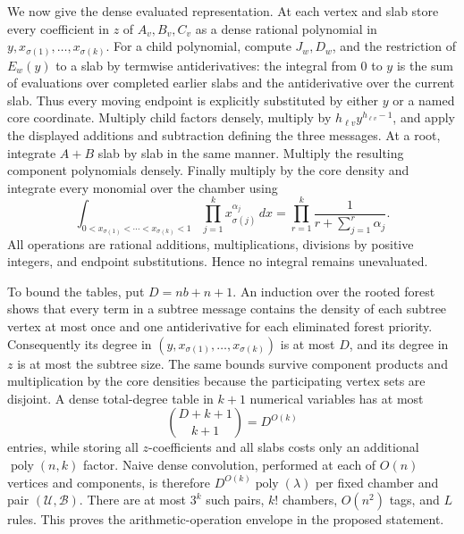 We now give the dense evaluated representation.  At each vertex and slab store every coefficient in \(z\) of \(A_v,B_v,C_v\) as a dense rational polynomial in \(y,x_{\sigma(1)},\ldots,x_{\sigma(k)}\).  For a child polynomial, compute \(J_w,D_w\), and the restriction of \(E_w(y)\) to a slab by termwise antiderivatives: the integral from \(0\) to \(y\) is the sum of evaluations over completed earlier slabs and the antiderivative over the current slab.  Thus every moving endpoint is explicitly substituted by either \(y\) or a named core coordinate.  Multiply child factors densely, multiply by \(h_{\ell v}y^{h_{\ell v}-1}\), and apply the displayed additions and subtraction defining the three messages.  At a root, integrate \(A+B\) slab by slab in the same manner.  Multiply the resulting component polynomials densely.  Finally multiply by the core density and integrate every monomial over the chamber using
\[
 \int_{0<x_{\sigma(1)}<\cdots<x_{\sigma(k)}<1}
    \prod_{j=1}^kx_{\sigma(j)}^{\alpha_j}\,dx
 =\prod_{r=1}^k\frac{1}{r+\sum_{j=1}^r\alpha_j}.
\]
All operations are rational additions, multiplications, divisions by positive integers, and endpoint substitutions.  Hence no integral remains unevaluated.

To bound the tables, put \(D=nb+n+1\).  An induction over the rooted forest shows that every term in a subtree message contains the density of each subtree vertex at most once and one antiderivative for each eliminated forest priority.  Consequently its degree in \((y,x_{\sigma(1)},\ldots,x_{\sigma(k)})\) is at most \(D\), and its degree in \(z\) is at most the subtree size.  The same bounds survive component products and multiplication by the core densities because the participating vertex sets are disjoint.  A dense total-degree table in \(k+1\) numerical variables has at most
\[
 \binom{D+k+1}{k+1}=D^{O(k)}
\]
entries, while storing all \(z\)-coefficients and all slabs costs only an additional \(\operatorname{poly}(n,k)\) factor.  Naive dense convolution, performed at each of \(O(n)\) vertices and components, is therefore \(D^{O(k)}\operatorname{poly}(\lambda)\) per fixed chamber and pair \((\mathcal U,\mathcal B)\).  There are at most \(3^k\) such pairs, \(k!\) chambers, \(O(n^2)\) tags, and \(L\) rules.  This proves the arithmetic-operation envelope in the proposed statement.

